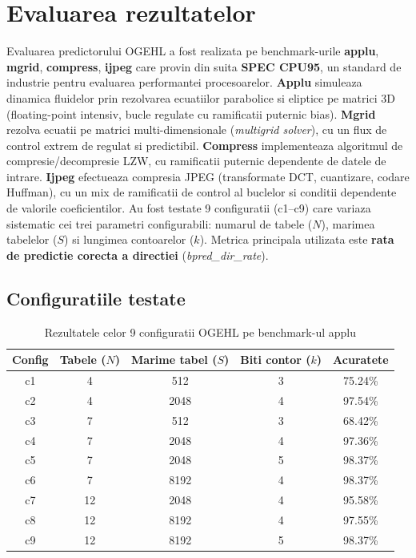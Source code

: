 \section{Evaluarea rezultatelor}

\newcommand{\graphscale}{0.9}

Evaluarea predictorului OGEHL a fost realizata pe benchmark-urile \textbf{applu}, \textbf{mgrid}, \textbf{compress}, \textbf{ijpeg}
care provin din suita \textbf{SPEC CPU95}, un standard de industrie pentru evaluarea performantei procesoarelor.
\textbf{Applu} simuleaza dinamica fluidelor prin rezolvarea ecuatiilor parabolice
si eliptice pe matrici 3D (floating-point intensiv, bucle regulate cu ramificatii
puternic bias). \textbf{Mgrid} rezolva ecuatii pe matrici multi-dimensionale (\textit{multigrid solver}),
cu un flux de control extrem de regulat si predictibil.
\textbf{Compress} implementeaza algoritmul de compresie/decompresie LZW, cu
ramificatii puternic dependente de datele de intrare.
\textbf{Ijpeg} efectueaza compresia JPEG (transformate DCT, cuantizare, codare
Huffman), cu un mix de ramificatii de control al buclelor si conditii dependente de valorile coeficientilor.
Au fost testate 9 configuratii (c1--c9) care variaza sistematic cei trei parametri configurabili: numarul de
tabele ($N$), marimea tabelelor ($S$) si lungimea contoarelor ($k$). Metrica
principala utilizata este \textbf{rata de predictie corecta a directiei} (\textit{bpred\_dir\_rate}).

\subsection{Configuratiile testate}

\begin{table}[H]
    \centering
    \small
    \begin{tabular}{|c|c|c|c|c|}
        \hline
        \textbf{Config} & \textbf{Tabele ($N$)} & \textbf{Marime tabel ($S$)} & \textbf{Biti contor ($k$)} & \textbf{Acuratete} \\
        \hline
        c1 & 4  & 512   & 3 & 75.24\% \\
        c2 & 4  & 2048  & 4 & 97.54\% \\
        c3 & 7  & 512   & 3 & 68.42\% \\
        c4 & 7  & 2048  & 4 & 97.36\% \\
        c5 & 7  & 2048  & 5 & 98.37\% \\
        c6 & 7  & 8192  & 4 & 98.37\% \\
        c7 & 12 & 2048  & 4 & 95.58\% \\
        c8 & 12 & 8192  & 4 & 97.55\% \\
        c9 & 12 & 8192  & 5 & 98.37\% \\
        \hline
    \end{tabular}
    \caption{Rezultatele celor 9 configuratii OGEHL pe benchmark-ul applu}
    \label{tab:eval_results}
\end{table}


